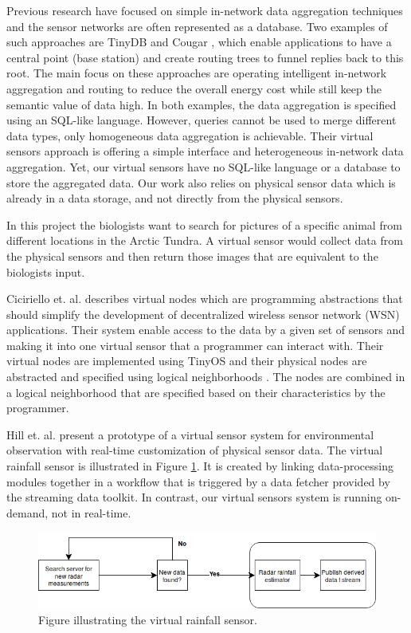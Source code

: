 \documentclass[USenglish]{uit-thesis}
\begin{document}
Previous research have focused on simple in-network data aggregation techniques and the sensor networks are often represented as a database. Two examples of such approaches are TinyDB \cite{tinyDB} and Cougar \cite{cougar}, which enable applications to have a central point (base station) and create routing trees  to funnel replies back to this root. The main focus on these approaches are operating intelligent in-network aggregation and routing to reduce  the overall energy cost while still keep the semantic value of data high.
In both examples, the data aggregation is specified using an SQL-like language. However, queries cannot be used to merge different data types, only homogeneous data aggregation is achievable.
Their virtual sensors approach is  offering a simple interface and heterogeneous in-network data aggregation. Yet, our virtual sensors have no SQL-like language or a database to store the aggregated data. Our work also relies on physical sensor data which is already in a data storage, and not directly from the physical sensors.

In this project the biologists want to search for pictures of a specific animal from different locations in the Arctic Tundra. A virtual sensor would collect data from the physical sensors and then return those images that are equivalent to the biologists input.

Ciciriello et. al.\cite{Ciciriello} describes virtual nodes which are programming abstractions that should simplify the development of decentralized wireless sensor network (WSN) applications. Their system enable access to the data by a given set of sensors and making it into one virtual sensor that a programmer can interact with. Their virtual nodes are implemented using TinyOS \cite{TinyOS} and their physical nodes are abstracted and specified using logical neighborhoods \cite{Mottola2006}\cite{Mottola2006_2}. The nodes are combined in a logical neighborhood that are specified based on their characteristics by the programmer. 


Hill et. al. \cite{hill} present a prototype of a virtual sensor system for environmental observation with real-time customization of physical sensor data. 
The virtual rainfall sensor is illustrated in Figure \ref{fig:rainfall_sensor}. It is created by linking data-processing modules together in a workflow that is triggered by a data fetcher provided by the streaming data toolkit.
In contrast, our virtual sensors system is running on-demand, not in real-time.

\begin{figure}
\centering
\includegraphics[width=\textwidth]{rainfall_sensor.png}
\caption{Figure illustrating the virtual rainfall sensor.}
\label{fig:rainfall_sensor}
\end{figure}
\end{document}
